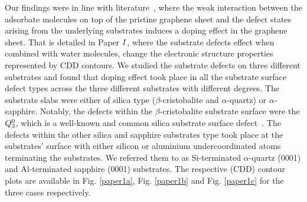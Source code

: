 Our findings were in line with literature~\cite{Wehling2008}, where the weak interaction between the adsorbate molecules on top of the pristine graphene sheet and the defect states arising from the underlying substrates induces a doping effect in the graphene sheet. That is detailed in Paper \hyperref[P1]{$\Rmnum{1}$}, where the substrate defects effect when combined with water molecules, change the electronic structure properties represented by CDD contours. We studied the substrate defects on three different substrates and found that doping effect took place in all the substrate surface defect types across the three different substrates with different degrees. The substrate slabs were either of silica type ($\beta$-cristobalite and $\alpha$-quartz) or $\alpha$-sapphire. Notably, the defects within the $\beta$-cristobalite substrate surface were the $Q_{\textrm 3}^{\textrm 0}$,  which is a well-known and common silica substrate surface defect~\cite{Wilson2000, Walsh2000}. The defects within the other silica and sapphire substrates type took place at the substrates' surface with either silicon or aluminium undercoordinated atoms terminating the substrates. We referred them to as Si-terminated $\alpha$-quartz (0001) and Al-terminated sapphire (0001) substrates. The respective (CDD) contour plots are available in Fig. \ref{paper1a}, Fig. \ref{paper1b} and Fig. \ref{paper1c} for the three cases respectively.

